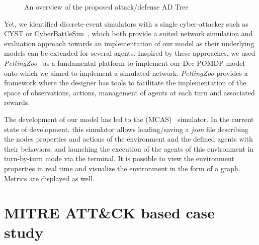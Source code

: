 \documentclass[conference]{IEEEtran}
\newcommand{\rem}[1]{\textcolor{red}{#1}}
\begin{document}
\begin{figure}
    \centering
    
    \caption{An overview of the proposed attack/defense AD Tree}
    \label{fig:ADTree}
\end{figure}

Yet, we identified discrete-event simulators with a single cyber-attacker such as CYST\citep{drasar_session-level_2020} or CyberBattleSim~\citep{cyberbattlesim}, which both provide a suited network simulation and evaluation approach towards an implementation of our model as their underlying models can be extended for several agents. Inspired by these approaches, we used \textit{PettingZoo}~\citep{jk2020} as a fundamental platform to implement our Dec-POMDP model onto which we aimed to implement a simulated network. \textit{PettingZoo} provides a framework where the designer has tools to facilitate the implementation of the space of observations, actions, management of agents at each turn and associated rewards.


The development of our model has led to the  (MCAS)~\citep{MCASWebsite} simulator. In the current state of development, this simulator allows loading/saving a \textit{json} file describing the nodes properties and actions of the environment and the defined agents with their behaviors; and launching the execution of the agents of this environment in turn-by-turn mode via the terminal. It is possible to view the environment properties in real time and visualize the environment in the form of a graph. Metrics are displayed as well.



\section{MITRE ATT\&CK based case study}

\end{document}
